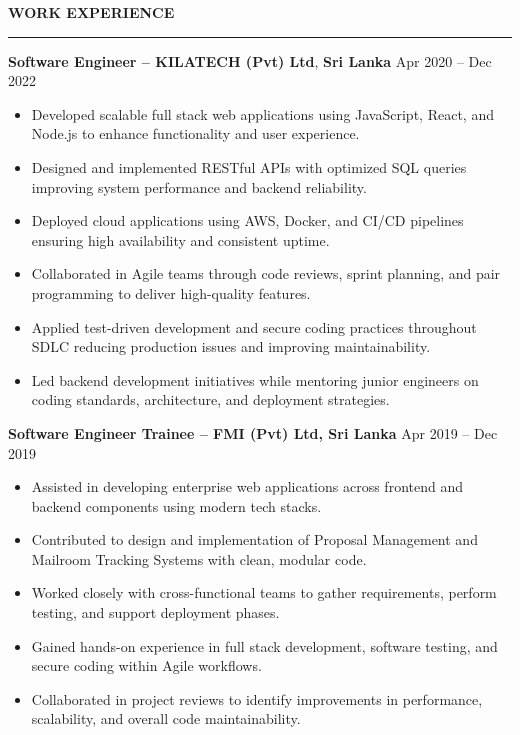 \documentclass[10pt,letterpaper]{article}
\begin{document}
\textbf{WORK EXPERIENCE}\\[-8pt]
\noindent\rule{\textwidth}{1pt}

\vspace{-2pt}

\textbf{Software Engineer -- KILATECH (Pvt) Ltd}, \textbf{Sri Lanka} \hfill Apr 2020 -- Dec 2022

\vspace{-1pt}

\begin{itemize}
\item Developed scalable full stack web applications using JavaScript, React, and Node.js to enhance functionality and user experience.
\item Designed and implemented RESTful APIs with optimized SQL queries improving system performance and backend reliability.
\item Deployed cloud applications using AWS, Docker, and CI/CD pipelines ensuring high availability and consistent uptime.
\item Collaborated in Agile teams through code reviews, sprint planning, and pair programming to deliver high-quality features.
\item Applied test-driven development and secure coding practices throughout SDLC reducing production issues and improving maintainability.
\item Led backend development initiatives while mentoring junior engineers on coding standards, architecture, and deployment strategies.
\end{itemize}

\textbf{Software Engineer Trainee -- FMI (Pvt) Ltd, Sri Lanka} \hfill Apr 2019 -- Dec 2019

\vspace{-1pt}

\begin{itemize}
\item Assisted in developing enterprise web applications across frontend and backend components using modern tech stacks.
\item Contributed to design and implementation of Proposal Management and Mailroom Tracking Systems with clean, modular code.
\item Worked closely with cross-functional teams to gather requirements, perform testing, and support deployment phases.
\item Gained hands-on experience in full stack development, software testing, and secure coding within Agile workflows.
\item Collaborated in project reviews to identify improvements in performance, scalability, and overall code maintainability.
\end{itemize}
\end{document}

